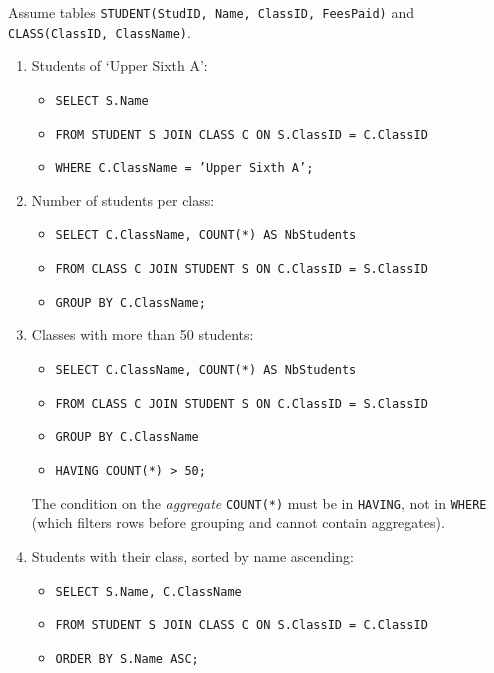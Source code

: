 \documentclass[11pt]{article}
\begin{document}
\begin{corrige}
Assume tables \texttt{STUDENT(StudID, Name, ClassID, FeesPaid)} and \texttt{CLASS(ClassID, ClassName)}.
\begin{enumerate}
\item Students of `Upper Sixth A':
\begin{itemize}
\item \texttt{SELECT S.Name}
\item \texttt{FROM STUDENT S JOIN CLASS C ON S.ClassID = C.ClassID}
\item \texttt{WHERE C.ClassName = 'Upper Sixth A';}
\end{itemize}
\item Number of students per class:
\begin{itemize}
\item \texttt{SELECT C.ClassName, COUNT(*) AS NbStudents}
\item \texttt{FROM CLASS C JOIN STUDENT S ON C.ClassID = S.ClassID}
\item \texttt{GROUP BY C.ClassName;}
\end{itemize}
\item Classes with more than 50 students:
\begin{itemize}
\item \texttt{SELECT C.ClassName, COUNT(*) AS NbStudents}
\item \texttt{FROM CLASS C JOIN STUDENT S ON C.ClassID = S.ClassID}
\item \texttt{GROUP BY C.ClassName}
\item \texttt{HAVING COUNT(*) > 50;}
\end{itemize}
The condition on the \emph{aggregate} \texttt{COUNT(*)} must be in \texttt{HAVING}, not in \texttt{WHERE} (which filters rows before grouping and cannot contain aggregates).
\item Students with their class, sorted by name ascending:
\begin{itemize}
\item \texttt{SELECT S.Name, C.ClassName}
\item \texttt{FROM STUDENT S JOIN CLASS C ON S.ClassID = C.ClassID}
\item \texttt{ORDER BY S.Name ASC;}
\end{itemize}
\end{enumerate}
\end{corrige}
\end{document}
